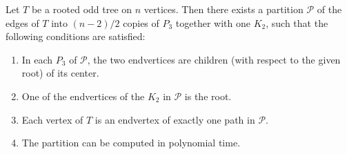 \documentclass[runningheads,orivec]{llncs}
\begin{document}
\begin{lemma}\label{lem_p3_partition}
Let $T$ be a rooted odd tree on $n$ vertices. Then there exists a partition $\mathcal{P}$ of the edges of $T$ into $(n-2)/2$ copies of $P_3$ together with one $K_2$, such that the following conditions are satisfied:
\begin{enumerate}
    \item In each $P_3$ of $\mathcal{P}$, the two endvertices are children (with respect to the given root) of its center.
    \item One of the endvertices of the $K_2$ in $\mathcal{P}$ is the root.
    \item Each vertex of $T$ is an endvertex of exactly one path in $\mathcal{P}$.
    \item The partition can be computed in polynomial time.
\end{enumerate}
\end{lemma}
\end{document}
